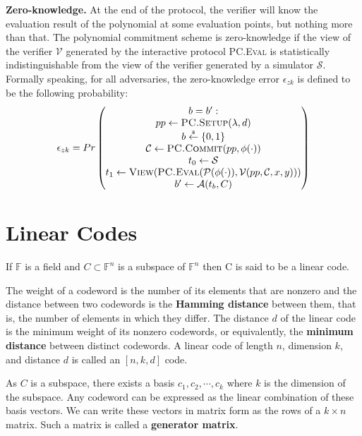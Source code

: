 \textbf{Zero-knowledge.} At the end of the protocol, the verifier will know the evaluation result of the polynomial at some evaluation points, but nothing more than that. The polynomial commitment scheme is zero-knowledge if the view of the verifier $\mathcal{V}$ generated by the interactive protocol \textsc{PC.Eval} is statistically indistinguishable from the view of the verifier generated by a simulator $\mathcal{S}$. Formally speaking, for all adversaries, the zero-knowledge error $\epsilon_{zk}$ is defined to be the following probability:
$$
\epsilon_{zk} = Pr
\begin{pmatrix}
 b = b^\prime : \\
 pp \leftarrow \textsc{PC.Setup}(\lambda, d) \\
 b \overset{{\scriptscriptstyle\$}}{\leftarrow} \{0, 1\} \\
 \mathcal{C} \leftarrow \textsc{PC.Commit}(pp, \phi(\cdot)) \\
 t_0 \leftarrow \mathcal{S} \\
 t_1 \leftarrow \textsc{View}(\textsc{PC.Eval}(\mathcal{P}(\phi(\cdot)), \mathcal{V}(pp, \mathcal{C}, x, y))) \\
 b^\prime \leftarrow \mathcal{A}(t_b, C)
\end{pmatrix}
$$

\section{Linear Codes}

\begin{definition}
If $\mathbb{F}$ is a field and $C \subset \mathbb{F}^n$ is a subspace of $\mathbb{F}^n$ then C is said to be a linear code.
\end{definition}

The weight of a codeword is the number of its elements that are nonzero and the distance between two codewords is the \textbf{Hamming distance} between them, that is, the number of elements in which they differ. The distance $d$ of the linear code is the minimum weight of its nonzero codewords, or equivalently, the \textbf{minimum distance} between distinct codewords. A linear code of length $n$, dimension $k$, and distance $d$ is called an $[n,k,d]$ code.

As $C$ is a subspace, there exists a basis $c_1, c_2, \cdots, c_k$ where $k$ is the dimension of the subspace. Any codeword can be expressed as the linear combination of these basis vectors. We can write these vectors in matrix form as the rows of a $k \times n$ matrix. Such a matrix is called a \textbf{generator matrix}.

